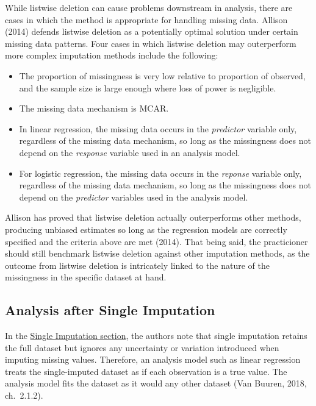 \documentclass[12pt,oneside]{chicagocapstone}
\providecommand{\tightlist}{%
  \setlength{\itemsep}{0pt}\setlength{\parskip}{0pt}}
\begin{document}
While listwise deletion can cause problems downstream in analysis, there
are cases in which the method is appropriate for handling missing data.
Allison (2014) defends listwise deletion as a potentially optimal
solution under certain missing data patterns. Four cases in which
listwise deletion may outerperform more complex imputation methods
include the following:
\begin{itemize}
\tightlist
\item
  The proportion of missingness is very low relative to proportion of
  observed, and the sample size is large enough where loss of power is
  negligible.
\item
  The missing data mechanism is MCAR.
\item
  In linear regression, the missing data occurs in the \emph{predictor}
  variable only, regardless of the missing data mechanism, so long as
  the missingness does not depend on the \emph{response} variable used
  in an analysis model.
\item
  For logistic regression, the missing data occurs in the \emph{reponse}
  variable only, regardless of the missing data mechanism, so long as
  the missingness does not depend on the \emph{predictor} variables used
  in the analysis model.
\end{itemize}
Allison has proved that listwise deletion actually outerperforms other
methods, producing unbiased estimates so long as the regression models
are correctly specified and the criteria above are met (2014). That
being said, the practicioner should still benchmark listwise deletion
against other imputation methods, as the outcome from listwise deletion
is intricately linked to the nature of the missingness in the specific
dataset at hand.

\subsection*{Analysis after Single
Imputation}\label{background-analysis-single}

In the \protect\hyperlink{background-single-imputation}{Single
Imputation section}, the authors note that single imputation retains the
full dataset but ignores any uncertainty or variation introduced when
imputing missing values. Therefore, an analysis model such as linear
regression treats the single-imputed dataset as if each observation is a
true value. The analysis model fits the dataset as it would any other
dataset (Van Buuren, 2018, ch.~2.1.2).
\end{document}
